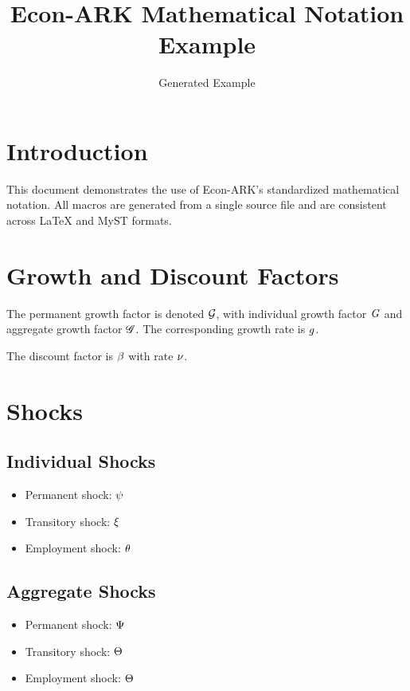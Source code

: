 \documentclass{article}
\title{Econ-ARK Mathematical Notation Example}
\author{Generated Example}
\begin{document}
\maketitle

\section{Introduction}

This document demonstrates the use of Econ-ARK's standardized mathematical notation. All macros are generated from a single source file and are consistent across LaTeX and MyST formats.

\section{Growth and Discount Factors}

The permanent growth factor is denoted $\mathcal{G}$, with individual growth factor $\mathit{G}$ and aggregate growth factor $\mathscr{G}$. The corresponding growth rate is $g$.

The discount factor is $\beta$ with rate $\nu$.

\section{Shocks}

\subsection{Individual Shocks}
\begin{itemize}
    \item Permanent shock: $\psi$
    \item Transitory shock: $\xi$ 
    \item Employment shock: $\theta$
\end{itemize}

\subsection{Aggregate Shocks}
\begin{itemize}
    \item Permanent shock: $\Psi$
    \item Transitory shock: $\Theta$
    \item Employment shock: $\Theta$
\end{itemize}
\end{document}
